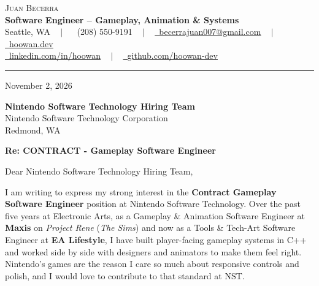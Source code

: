 \documentclass[letterpaper,11pt]{article}
\begin{document}
\begin{center}
    {\Huge \scshape Juan Becerra} \\ \vspace{4pt}
    \textbf{\large Software Engineer -- Gameplay, Animation \& Systems} \\ \vspace{4pt}
    \small Seattle, WA ~ $|$ ~
    \raisebox{-0.1\height}\faPhone\ (208) 550-9191 ~ $|$ ~
    \href{mailto:becerrajuan007@gmail.com}{\raisebox{-0.2\height}\faEnvelope\ \underline{becerrajuan007@gmail.com}} ~ $|$ ~
    \href{https://hoowan.dev}{\raisebox{-0.2\height}\faGlobe\ \underline{hoowan.dev}} \\ \vspace{2pt}
    \href{https://linkedin.com/in/hoowan/}{\raisebox{-0.2\height}\faLinkedin\ \underline{linkedin.com/in/hoowan}} ~ $|$ ~
    \href{https://github.com/hoowan-dev}{\raisebox{-0.2\height}\faGithub\ \underline{github.com/hoowan-dev}}
\end{center}

\vspace{4pt}
\hrule
\vspace{14pt}

\noindent November 2, 2026

\vspace{8pt}
\noindent \textbf{Nintendo Software Technology Hiring Team} \\
Nintendo Software Technology Corporation \\
Redmond, WA

\vspace{8pt}
\noindent \textbf{Re: CONTRACT - Gameplay Software Engineer}

\vspace{8pt}
\noindent Dear Nintendo Software Technology Hiring Team,

I am writing to express my strong interest in the \textbf{Contract Gameplay Software Engineer} position at
Nintendo Software Technology. Over the past five years at Electronic Arts, as a Gameplay \& Animation Software
Engineer at \textbf{Maxis} on \emph{Project Rene} (\emph{The Sims}) and now as a Tools \& Tech-Art Software
Engineer at \textbf{EA Lifestyle}, I have built player-facing gameplay systems in C++ and worked side by side
with designers and animators to make them feel right. Nintendo's games are the reason I care so much about
responsive controls and polish, and I would love to contribute to that standard at NST.
\end{document}
